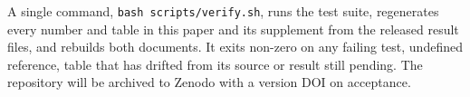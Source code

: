 \documentclass[final,3p]{elsarticle}
\begin{document}
A single command, \texttt{bash scripts/\allowbreak verify.sh}, runs the test suite, regenerates every number and table in this paper and its supplement from the released result files, and rebuilds both documents. It exits non-zero on any failing test, undefined reference, table that has drifted from its source or result still pending. The repository will be archived to Zenodo with a version DOI on acceptance.



\end{document}
